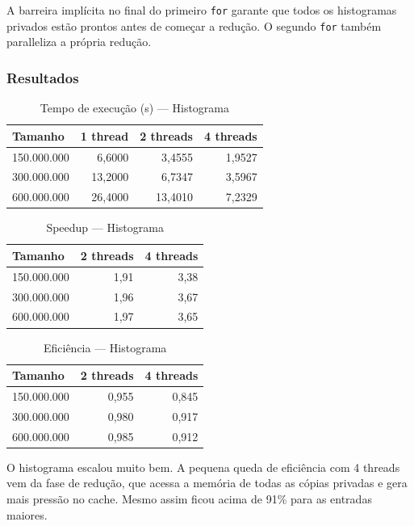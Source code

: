 \documentclass[12pt]{article}
\begin{document}
A barreira implícita no final do primeiro \texttt{for} garante que todos os histogramas privados estão prontos antes de começar a redução. O segundo \texttt{for} também paralleliza a própria redução.

\subsubsection{Resultados}

\begin{table}[H]
\centering
\caption{Tempo de execução (s) --- Histograma}
\begin{tabular}{lrrr}
\toprule
\textbf{Tamanho} & \textbf{1 thread} & \textbf{2 threads} & \textbf{4 threads} \\
\midrule
150.000.000 & 6,6000 & 3,4555 & 1,9527 \\
300.000.000 & 13,2000 & 6,7347 & 3,5967 \\
600.000.000 & 26,4000 & 13,4010 & 7,2329 \\
\bottomrule
\end{tabular}
\end{table}

\begin{table}[H]
\centering
\caption{Speedup --- Histograma}
\begin{tabular}{lrr}
\toprule
\textbf{Tamanho} & \textbf{2 threads} & \textbf{4 threads} \\
\midrule
150.000.000 & 1,91 & 3,38 \\
300.000.000 & 1,96 & 3,67 \\
600.000.000 & 1,97 & 3,65 \\
\bottomrule
\end{tabular}
\end{table}

\begin{table}[H]
\centering
\caption{Eficiência --- Histograma}
\begin{tabular}{lrr}
\toprule
\textbf{Tamanho} & \textbf{2 threads} & \textbf{4 threads} \\
\midrule
150.000.000 & 0,955 & 0,845 \\
300.000.000 & 0,980 & 0,917 \\
600.000.000 & 0,985 & 0,912 \\
\bottomrule
\end{tabular}
\end{table}

O histograma escalou muito bem. A pequena queda de eficiência com 4 threads vem da fase de redução, que acessa a memória de todas as cópias privadas e gera mais pressão no cache. Mesmo assim ficou acima de 91\% para as entradas maiores.
\end{document}
